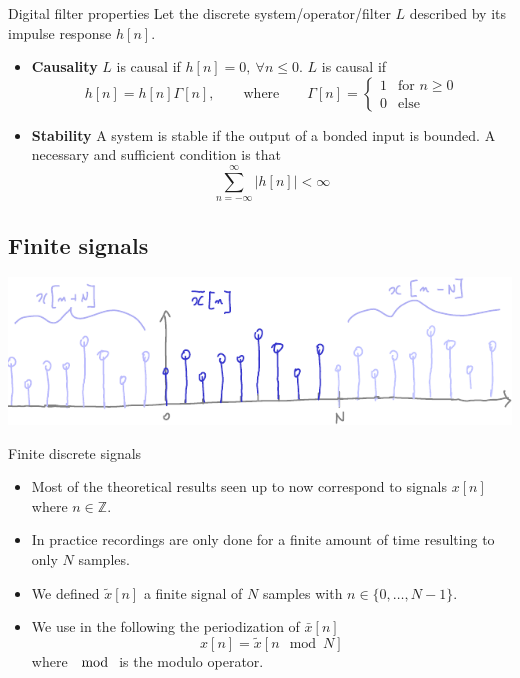 \begin{block}{Digital filter properties}
  Let the discrete system/operator/filter $L$ described by its impulse response $h[n]$.
  \begin{itemize}
      \item \textbf{Causality} $L$ is causal if $h[n]=0,\ \forall n\leq 0$. $L$ is causal if 
   \begin{equation}
          h[n]=h[n]\Gamma[n],\qquad\text{where}\qquad     \Gamma[n]=
          \begin{cases}
              1& \text{for } n\geq 0\\
              0 & \text{else}
            \end{cases}
          \label{eq:causal_discrete}
      \end{equation}
      \item \textbf{Stability} A system is stable if the output of a bonded input is bounded. A necessary and sufficient condition is that
      \begin{equation}
          \sum_{n=-\infty}^\infty |h[n]|<\infty
          \label{eq:stable_system}
      \end{equation}
      
      
  \end{itemize}
  
\end{block}

\subsection{Finite signals}
\label{sec:finite}

\begin{center}
  \includegraphics[width=.8\linewidth]{imgs/sig_conv/finite_discrete-crop.pdf}
\end{center}

\begin{block}{Finite discrete signals}
  \begin{itemize}
      \item Most of the theoretical results seen up to now correspond to signals $x[n]$ where $n\in\mathbb{Z}$.
      \item In practice recordings are only done for a finite amount of time resulting to only $N$ samples. 
      \item We defined $\tilde x[n]$ a finite signal of $N$ samples with $n\in \{0,\dots,N-1\}$.
      \item We use in the following the periodization of $\bar x[n]$
      $$ x[n] = \tilde x[n\mod N] $$
      where $\mod$ is the modulo operator.
  \end{itemize}
\end{block}

